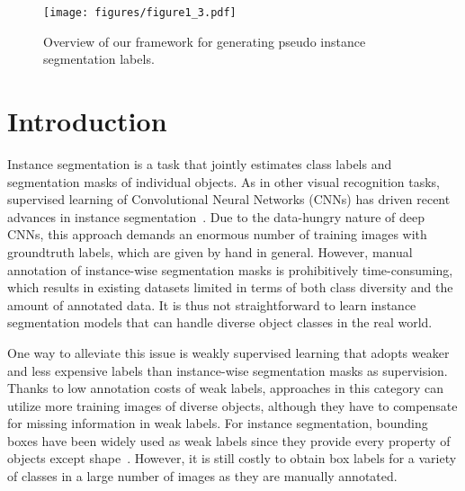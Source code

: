 


\begin{figure*} [!t]
\centering
\texttt{[image: figures/figure1\_3.pdf]}
\caption{
Overview of our framework for generating pseudo instance segmentation labels.
} 
\vspace{-0.3cm}
\label{fig:label_synthesis}
\end{figure*}


\section{Introduction}
\label{sec:intro}
Instance segmentation is a task that jointly estimates class labels and segmentation masks of individual objects.
As in other visual recognition tasks, supervised learning of Convolutional Neural Networks (CNNs) has driven recent advances in instance segmentation~\cite{Sds,DAICVPR15,Dai16_SDS,mask_rcnn,instancecut,Semiconv,Dai2016,Liu2016}.
Due to the data-hungry nature of deep CNNs, this approach demands an enormous number of training images with groundtruth labels, which are given by hand in general. 
However, manual annotation of instance-wise segmentation masks is prohibitively time-consuming, which results in existing datasets limited in terms of both class diversity and the amount of annotated data.
It is thus not straightforward to learn instance segmentation models that can handle diverse object classes in the real world.


One way to alleviate this issue is weakly supervised learning that adopts weaker and less expensive labels than instance-wise segmentation masks as supervision.
Thanks to low annotation costs of weak labels, approaches in this category can utilize more training images of diverse objects, although they have to compensate for missing information in weak labels.
For instance segmentation, bounding boxes have been widely used as weak labels since they provide every property of objects except shape~\cite{SDI,Cutnpaste}.
However, it is still costly to obtain box labels for a variety of classes in a large number of images as they are manually annotated.


